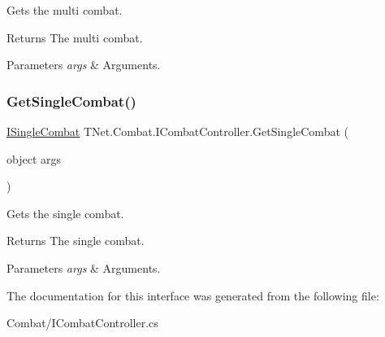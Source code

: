 Gets the multi combat. 

\begin{DoxyReturn}{Returns}
The multi combat.
\end{DoxyReturn}

\begin{DoxyParams}{Parameters}
{\em args} & Arguments.\\
\hline
\end{DoxyParams}
\mbox{\label{interface_t_net_1_1_combat_1_1_i_combat_controller_a99d413ee501a9487fba4f65294e0c796}} 
\subsubsection{\texorpdfstring{Get\+Single\+Combat()}{GetSingleCombat()}}
{\footnotesize\ttfamily \mbox{\hyperlink{interface_t_net_1_1_combat_1_1_i_single_combat}{I\+Single\+Combat}} T\+Net.\+Combat.\+I\+Combat\+Controller.\+Get\+Single\+Combat (\begin{DoxyParamCaption}\item[{object}]{args }\end{DoxyParamCaption})}



Gets the single combat. 

\begin{DoxyReturn}{Returns}
The single combat.
\end{DoxyReturn}

\begin{DoxyParams}{Parameters}
{\em args} & Arguments.\\
\hline
\end{DoxyParams}


The documentation for this interface was generated from the following file\+:\begin{DoxyCompactItemize}
\item 
Combat/I\+Combat\+Controller.\+cs\end{DoxyCompactItemize}
